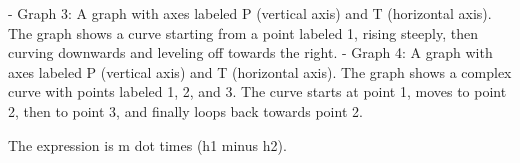 - Graph 3: A graph with axes labeled P (vertical axis) and T (horizontal axis). The graph shows a curve starting from a point labeled 1, rising steeply, then curving downwards and leveling off towards the right.
- Graph 4: A graph with axes labeled P (vertical axis) and T (horizontal axis). The graph shows a complex curve with points labeled 1, 2, and 3. The curve starts at point 1, moves to point 2, then to point 3, and finally loops back towards point 2.

The expression is m dot times (h1 minus h2).